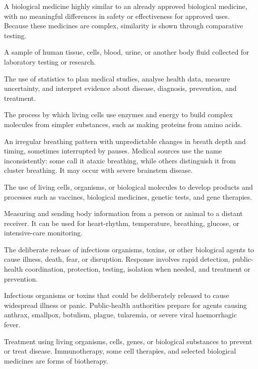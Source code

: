  A biological medicine highly similar to an already approved biological medicine, with no meaningful differences in safety or effectiveness for approved uses. Because these medicines are complex, similarity is shown through comparative testing.

 A sample of human tissue, cells, blood, urine, or another body fluid collected for laboratory testing or research.

 The use of statistics to plan medical studies, analyse health data, measure uncertainty, and interpret evidence about disease, diagnosis, prevention, and treatment.

 The process by which living cells use enzymes and energy to build complex molecules from simpler substances, such as making proteins from amino acids.

 An irregular breathing pattern with unpredictable changes in breath depth and timing, sometimes interrupted by pauses. Medical sources use the name inconsistently: some call it ataxic breathing, while others distinguish it from cluster breathing. It may occur with severe brainstem disease.

 The use of living cells, organisms, or biological molecules to develop products and processes such as vaccines, biological medicines, genetic tests, and gene therapies.

 Measuring and sending body information from a person or animal to a distant receiver. It can be used for heart-rhythm, temperature, breathing, glucose, or intensive-care monitoring.

 The deliberate release of infectious organisms, toxins, or other biological agents to cause illness, death, fear, or disruption. Response involves rapid detection, public-health coordination, protection, testing, isolation when needed, and treatment or prevention.

 Infectious organisms or toxins that could be deliberately released to cause widespread illness or panic. Public-health authorities prepare for agents causing anthrax, smallpox, botulism, plague, tularemia, or severe viral haemorrhagic fever.

 Treatment using living organisms, cells, genes, or biological substances to prevent or treat disease. Immunotherapy, some cell therapies, and selected biological medicines are forms of biotherapy.

